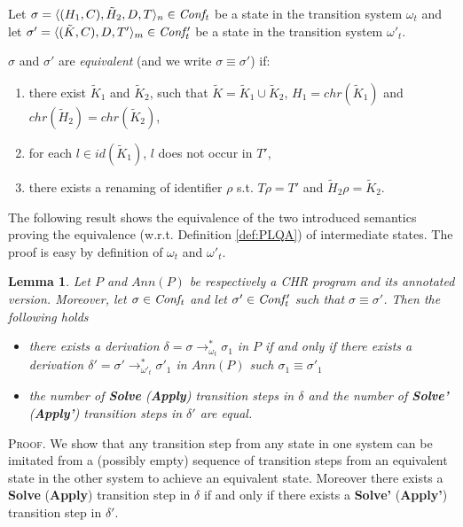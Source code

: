 \documentclass[final]{acmtrans2e}
\newtheorem{lemma}[theorem]{Lemma}
\newcommand{\la}{\langle}
\newcommand{\ra}{\rangle}
\newcommand{\rrarrow}{\longrightarrow}
\begin{document}
\begin{definition}\label{def:PLQA}
 Let
 $\sigma=\la(H_1,C),\tilde H_2, D, T\ra_n \in {\it Conf_t}$ be a state in the transition system $\omega_t$ and let  $\sigma'=\la(\tilde K,C), D, T'\ra_m \in {\it Conf'_t}$ be a state in the transition system $\omega'_t$.

$\sigma$ and $\sigma'$ are \emph{equivalent} (and we write
$\sigma\equiv\sigma'$) if:
\begin{enumerate}
\item  there exist $\tilde K_1$ and $\tilde K_2$, such that $\tilde K =\tilde K_1\cup \tilde K_2$, $H_1 = chr(\tilde K_1)$ and $chr (\tilde H_2) = chr(\tilde K_2)$,
\item for each $l \in id (\tilde K_1)$, $l$ does not occur in $T'$,
\item there exists a renaming of identifier $\rho$ s.t. $T\rho=T'$ and $\tilde H_2 \rho= \tilde K_2$.
\end{enumerate}
\end{definition}


The following result shows the equivalence of the two introduced
semantics proving the equivalence (w.r.t. Definition \ref{def:PLQA})
of intermediate states. The proof
is easy by definition of $\omega_t$ and $\omega'_t$.


\begin{lemma}\label{lemma:intermequiv}
Let $P$ and $Ann(P)$ be respectively a CHR program and its annotated version.
Moreover, let
$\sigma \in {\it Conf_t}$ and let  $\sigma' \in {\it Conf'_t}$ such that
$\sigma\equiv\sigma'$.
Then the following holds
\begin{itemize}
  \item there exists a derivation $\delta = \sigma \rrarrow^*_{\omega_t} \sigma_1$ in $P$ if and only if
there exists a derivation $\delta' =\sigma' \rrarrow^*_{\omega'_t} \sigma'_1$ in $Ann(P)$ such  $\sigma_1\equiv\sigma'_1$
  \item the number of \textbf{Solve} (\textbf{Apply}) transition steps in $\delta$ and the number of \textbf{Solve'} (\textbf{Apply'}) transition steps in $\delta'$ are equal.
\end{itemize}
\end{lemma}
\textsc{Proof.}
 We show that any transition step from any state in one system can be imitated from a (possibly empty) sequence of  transition steps from an equivalent state in the other system to achieve an equivalent state.
 Moreover there exists a \textbf{Solve} (\textbf{Apply}) transition step in $\delta$ if and only if there exists a  \textbf{Solve'} (\textbf{Apply'}) transition step in $\delta'$.
\end{document}
